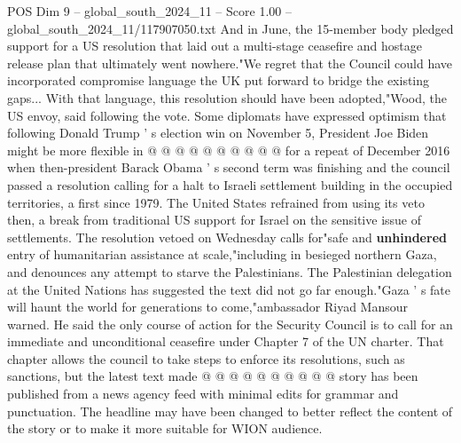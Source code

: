 \begin{textsample}{POS Dim 9 – global\_south\_2024\_11 – Score 1.00 – global\_south\_2024\_11/117907050.txt}
And in June, the 15-member body pledged support for a US resolution that laid out a multi-stage ceasefire and hostage release plan that ultimately went nowhere."We regret that the Council could have incorporated compromise language the UK put forward to bridge the existing gaps...
With that language, this resolution should have been adopted,"Wood, the US envoy, said following the vote.
Some diplomats have expressed optimism that following Donald Trump ' s election win on November 5, President Joe Biden might be more flexible in @ @ @ @ @ @ @ @ @ @ for a repeat of December 2016 when then-president Barack Obama ' s second term was finishing and the council passed a resolution calling for a halt to Israeli settlement building in the occupied territories, a first since 1979.
The United States refrained from using its veto then, a break from traditional US support for Israel on the sensitive issue of settlements.
The resolution vetoed on Wednesday calls for"safe and \textbf{unhindered} entry of humanitarian assistance at scale,"including in besieged northern Gaza, and denounces any attempt to starve the Palestinians.
The Palestinian delegation at the United Nations has suggested the text did not go far enough."Gaza ' s fate will haunt the world for generations to come,"ambassador Riyad Mansour warned.
He said the only course of action for the Security Council is to call for an immediate and unconditional ceasefire under Chapter 7 of the UN charter.
That chapter allows the council to take steps to enforce its resolutions, such as sanctions, but the latest text made @ @ @ @ @ @ @ @ @ @ story has been published from a news agency feed with minimal edits for grammar and punctuation.
The headline may have been changed to better reflect the content of the story or to make it more suitable for WION audience.

\end{textsample}
